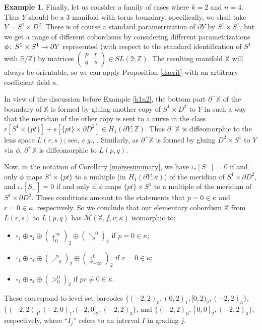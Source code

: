 \documentclass[11pt]{amsart}
\theoremstyle{definition}
\newtheorem{ex}[theorem]{Example}
\theoremstyle{remark}
\numberwithin{equation}{section}
\def\co{\colon\thinspace}
\def\Z{\mathbb{Z}}
\begin{document}
\begin{ex}\label{k2n4}
	Finally, let us consider a family of cases where $k=2$ and $n=4$.  Thus $Y$ should be a $3$-manifold with torus boundary; specifically, we shall take $Y=S^1\times D^2$.  There is of course a standard parametrization of $\partial Y$ by $S^1\times S^1$, but we get a range of different cobordisms by considering different parametrizations $\phi\co S^1\times S^1\to \partial Y$ represented (with respect to the standard identification of $S^1$ with $\mathbb{R}/\mathbb{Z}$)  by matrices $\left(\begin{array}{cc} p & r \\ q & s\end{array}\right)\in SL(2;\Z)$.  The resulting manifold $\mathbb{X}$ will always be orientable, so we can apply Proposition \ref{dacrit} with an arbitrary coefficient field $\kappa$. 
	
	In view of the discussion before Example \ref{k1n2}, the bottom part $\partial^-\mathbb{X}$ of the boundary of $\mathbb{X}$ is formed by gluing another copy of $S^1\times D^2$ to $Y$ in such a way that the meridian of the other copy is sent to a curve in the class $r[S^1\times\{pt\}]+s[\{pt\}\times \partial D^2]\in H_1(\partial Y;\Z)$.  Thus $\partial^-\mathbb{X}$ is diffeomorphic to the lens space $L(r,s)$; see, \emph{e.g.}, \cite[Chapter 9]{Rol}.  Similarly, as $\partial^+\mathbb{X}$ is formed by gluing $D^2\times S^1$ to $Y$ via $\phi$, $\partial^+\mathbb{X}$ is diffeomorphic to $L(p,q)$.
	
	Now, in the notation of Corollary \ref{morsesummary}, we have $\iota_*[S_-]=0$ if and only $\phi$ maps $S^1\times\{pt\}$ to a multiple (in $H_1(\partial Y;\kappa)$) of the meridian of $S^1\times \partial D^2$, and $\iota_*[S_+]=0$ if and only if $\phi$ maps $\{pt\}\times S^1$ to a multiple of the meridian of $S^1\times \partial D^2$.  These conditions amount to the statements that $p=0\in\kappa$ and $r=0\in\kappa$, respectively.  So we conclude that our elementary cobordism $\mathbb{X}$ from $L(r,s)$ to $L(p,q)$ has $\mathcal{M}(\mathbb{X},f,v;\kappa)$ isomorphic to: \begin{itemize} \item $\square_1\oplus\square_4\oplus (\uparrow_0^{\infty})_2\oplus (\searrow^0)_2$ if $p=0\in\kappa$; \item $\square_1\oplus \square_4\oplus (\nearrow_0)_2\oplus (\downarrow^{0}_{-\infty})_2$ if $r=0\in\kappa$; \item $\square_1\oplus \square_4\oplus(>_0^0)_2$ if $pr\neq 0\in\kappa$.
\end{itemize}
These correspond to level set barcodes $\{(-2,2)_0,(0,2)_1,[0,2)_2,(-2,2)_3\}$, $\{(-2,2)_0,(-2,0)_1,(-2,0]_2,(-2,2)_3\}$, and $\{(-2,2)_0,[0,0]_2,(-2,2)_3\}$, respectively, where ``$I_j$'' refers to an interval $I$ in grading $j$.
\end{ex}
\end{document}
